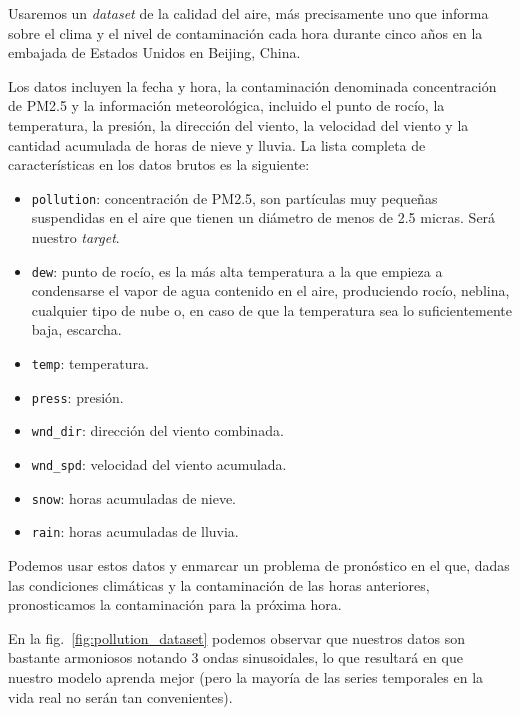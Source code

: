 \documentclass[a4paper,12pt]{article}
\begin{document}
Usaremos un \textit{dataset} de la calidad del aire, más precisamente uno que informa sobre el clima y el nivel de contaminación cada hora durante cinco años en la embajada de Estados Unidos en Beijing, China.

Los datos incluyen la fecha y hora, la contaminación denominada concentración de PM2.5 y la información meteorológica, incluido el punto de rocío, la temperatura, la presión, la dirección del viento, la velocidad del viento y la cantidad acumulada de horas de nieve y lluvia. La lista completa de características en los datos brutos es la siguiente:

\begin{itemize}
	\item \texttt{pollution}: concentración de PM2.5, son partículas muy pequeñas suspendidas en el aire que tienen un diámetro de menos de 2.5 micras. Será nuestro \textit{target}.
	\item \texttt{dew}: punto de rocío, es la más alta temperatura a la que empieza a condensarse el vapor de agua contenido en el aire, produciendo rocío, neblina, cualquier tipo de nube o, en caso de que la temperatura sea lo suficientemente baja, escarcha.
	\item \texttt{temp}: temperatura.
	\item \texttt{press}: presión.
	\item \texttt{wnd\_dir}: dirección del viento combinada.
	\item \texttt{wnd\_spd}: velocidad del viento acumulada.
	\item \texttt{snow}: horas acumuladas de nieve.
	\item \texttt{rain}: horas acumuladas de lluvia.
\end{itemize}

Podemos usar estos datos y enmarcar un problema de pronóstico en el que, dadas las condiciones climáticas y la contaminación de las horas anteriores, pronosticamos la contaminación para la próxima hora.

En la fig.~\ref{fig:pollution_dataset} podemos observar que nuestros datos son bastante armoniosos notando 3 ondas sinusoidales, lo que resultará en que nuestro modelo aprenda mejor (pero la mayoría de las series temporales en la vida real no serán tan convenientes).
\end{document}
